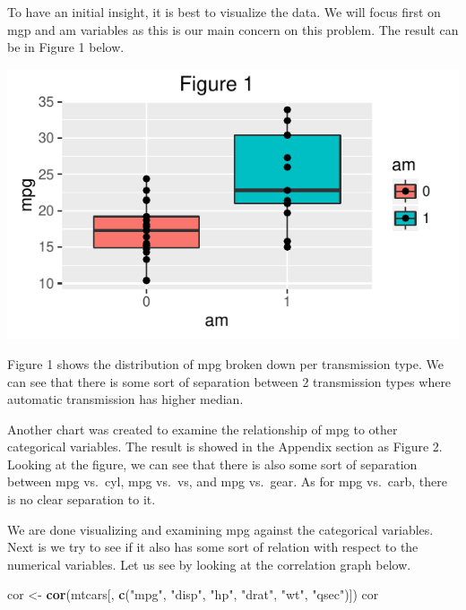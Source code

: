 \documentclass[]{article}
\newenvironment{Shaded}{\begin{snugshade}}{\end{snugshade}}
\newcommand{\KeywordTok}[1]{\textcolor[rgb]{0.13,0.29,0.53}{\textbf{#1}}}
\newcommand{\StringTok}[1]{\textcolor[rgb]{0.31,0.60,0.02}{#1}}
\newcommand{\NormalTok}[1]{#1}
\begin{document}
To have an initial insight, it is best to visualize the data. We will
focus first on mgp and am variables as this is our main concern on this
problem. The result can be in Figure 1 below.

\begin{center}\includegraphics{Course_7_Week_4_Regression_Models_files/figure-latex/unnamed-chunk-5-1} \end{center}

Figure 1 shows the distribution of mpg broken down per transmission
type. We can see that there is some sort of separation between 2
transmission types where automatic transmission has higher median.

Another chart was created to examine the relationship of mpg to other
categorical variables. The result is showed in the Appendix section as
Figure 2. Looking at the figure, we can see that there is also some sort
of separation between mpg vs.~cyl, mpg vs.~vs, and mpg vs.~gear. As for
mpg vs.~carb, there is no clear separation to it.

We are done visualizing and examining mpg against the categorical
variables. Next is we try to see if it also has some sort of relation
with respect to the numerical variables. Let us see by looking at the
correlation graph below.

\begin{Shaded}
\begin{Highlighting}[]
\NormalTok{cor <-}\StringTok{ }\KeywordTok{cor}\NormalTok{(mtcars[, }\KeywordTok{c}\NormalTok{(}\StringTok{"mpg"}\NormalTok{, }\StringTok{"disp"}\NormalTok{, }\StringTok{"hp"}\NormalTok{, }\StringTok{"drat"}\NormalTok{, }\StringTok{"wt"}\NormalTok{, }\StringTok{"qsec"}\NormalTok{)])}
\NormalTok{cor}
\end{Highlighting}
\end{Shaded}
\end{document}
